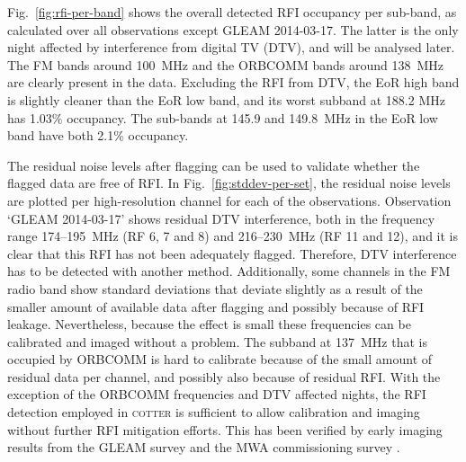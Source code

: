 \documentclass{pasa}
\begin{document}
Fig.~\ref{fig:rfi-per-band} shows the overall detected RFI occupancy per sub-band, as calculated over all observations except GLEAM 2014-03-17. The latter is the only night affected by interference from digital TV (DTV), and will be analysed later. The FM bands around 100~MHz and the ORBCOMM bands around 138~MHz are clearly present in the data. Excluding the RFI from DTV, the EoR high band is slightly cleaner than the EoR low band, and its worst subband at 188.2 MHz has 1.03\% occupancy. The sub-bands at 145.9 and 149.8~MHz in the EoR low band have both 2.1\% occupancy.

The residual noise levels after flagging can be used to validate whether the flagged data are free of RFI. In Fig.~\ref{fig:stddev-per-set}, the residual noise levels are plotted per high-resolution channel for each of the observations. Observation `GLEAM 2014-03-17' shows residual DTV interference, both in the frequency range 174--195~MHz (RF 6, 7 and 8) and 216--230~MHz (RF 11 and 12), and it is clear that this RFI has not been adequately flagged. Therefore, DTV interference has to be detected with another method. Additionally, some channels in the FM radio band show standard deviations that deviate slightly as a result of the smaller amount of available data after flagging and possibly because of RFI leakage. Nevertheless, because the effect is small these frequencies can be calibrated and imaged without a problem. The subband at 137~MHz that is occupied by ORBCOMM is hard to calibrate because of the small amount of residual data per channel, and possibly also because of residual RFI. With the exception of the ORBCOMM frequencies and DTV affected nights, the RFI detection employed in \textsc{cotter} is sufficient to allow calibration and imaging without further RFI mitigation efforts. This has been verified by early imaging results from the GLEAM survey and the MWA commissioning survey \citep{mwacs-2014}.
\end{document}
